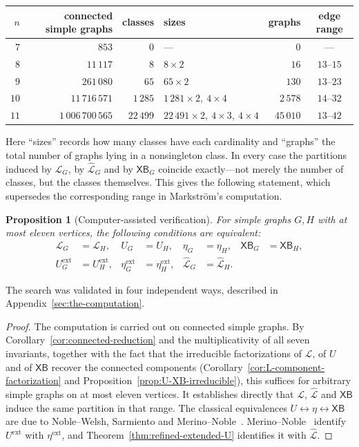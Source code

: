 \documentclass[11pt]{article}
\theoremstyle{plain}
\newtheorem{proposition}[theorem]{Proposition}
\theoremstyle{definition}
\renewcommand{\mathcal}{\mathscr}
\newcommand{\LL}{\mathcal{L}}    %
\newcommand{\XB}{\mathsf{XB}} %
\newcommand{\ext}{\mathrm{ext}}
\numberwithin{equation}{section}
\begin{document}
\begin{center}
\begin{tabular}{rrrlrc}
\toprule
$n$ & connected simple graphs & classes & sizes & graphs & edge range \\
\midrule
$7$    & $853$              & $0$      & ---                                   & $0$      & ---        \\
$8$    & $11\,117$          & $8$      & $8\times2$                            & $16$     & $13$--$15$ \\
$9$    & $261\,080$         & $65$     & $65\times2$                           & $130$    & $13$--$23$ \\
$10$   & $11\,716\,571$     & $1\,285$ & $1\,281\times2,\ 4\times4$              & $2\,578$ & $14$--$32$ \\
$11$   & $1\,006\,700\,565$ & $22\,499$& $22\,491\times2,\ 4\times3,\ 4\times4$  & $45\,010$& $13$--$42$ \\
\bottomrule
\end{tabular}
\end{center}

Here ``sizes'' records how many classes have each cardinality and ``graphs''
the total number of graphs lying in a nonsingleton class.  In every case the
partitions induced by $\LL_G$, by $\widehat{\LL}_G$ and by $\XB_G$ coincide
exactly---not merely the number of classes, but the classes themselves.  This
gives the following statement, which supersedes the corresponding range in
Markstr\"om's computation.

\begin{proposition}[Computer-assisted verification]
\label{prop:computational-evidence}
For simple graphs $G,H$ with at most eleven vertices, the following
conditions are equivalent:
\begin{align*}
   \LL_G&=\LL_H, & U_G&=U_H, & \eta_G&=\eta_H, & \XB_G&=\XB_H,\\
   U_G^{\ext}&=U_H^{\ext}, & \eta_G^{\ext}&=\eta_H^{\ext},
   & \widehat{\LL}_G&=\widehat{\LL}_H. &&
\end{align*}
\end{proposition}

The search was validated in four independent ways, described in
Appendix~\ref{sec:the-computation}.

\begin{proof}
The computation is carried out on connected simple graphs.  By
Corollary~\ref{cor:connected-reduction} and the multiplicativity of all seven
invariants, together with the fact that the irreducible factorizations of
$\LL$, of $U$ and of $\XB$ recover the connected components
(Corollary~\ref{cor:L-component-factorization} and
Proposition~\ref{prop:U-XB-irreducible}), this suffices for arbitrary simple
graphs on at most eleven vertices.  It establishes directly that $\LL$,
$\widehat{\LL}$ and $\XB$ induce the same partition in that range.  The
classical equivalences $U\leftrightarrow\eta\leftrightarrow \XB$ are due to
Noble--Welsh, Sarmiento and Merino--Noble~\cite{NW,Sar,MN,Nob}.
Merino--Noble~\cite{MN} identify $U^{\ext}$ with
$\eta^{\ext}$, and Theorem~\ref{thm:refined-extended-U} identifies it
with $\widehat{\LL}$.
\end{proof}
\end{document}
